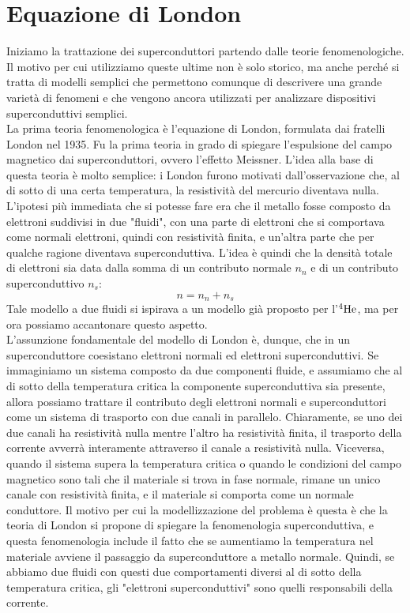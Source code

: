 \section{Equazione di London}
Iniziamo la trattazione dei superconduttori partendo dalle teorie fenomenologiche. Il motivo per cui utilizziamo queste ultime non è solo storico, ma anche perché si tratta di modelli semplici che permettono comunque di descrivere una grande varietà di fenomeni e che vengono ancora utilizzati per analizzare dispositivi superconduttivi semplici.\\
La prima teoria fenomenologica è l'equazione di London, formulata dai fratelli London nel 1935. Fu la prima teoria in grado di spiegare l'espulsione del campo magnetico dai superconduttori, ovvero l'effetto Meissner. L'idea alla base di questa teoria è molto semplice: i London furono motivati dall'osservazione che, al di sotto di una certa temperatura, la resistività del mercurio diventava nulla. L'ipotesi più immediata che si potesse fare era che il metallo fosse composto da elettroni suddivisi in due "fluidi", con una parte di elettroni che si comportava come normali elettroni, quindi con resistività finita, e un'altra parte che per qualche ragione diventava superconduttiva. L'idea è quindi che la densità totale di elettroni sia data dalla somma di un contributo normale $n_n$ e di un contributo superconduttivo $n_s$:
\begin{equation}
   n=n_n + n_s
   \label{eq:densita_elettroni}
\end{equation}
Tale modello a due fluidi si ispirava a un modello già proposto per l'$^4\rm He$, ma per ora possiamo accantonare questo aspetto.\\
L'assunzione fondamentale del modello di London è, dunque, che in un superconduttore coesistano elettroni normali ed elettroni superconduttivi. Se immaginiamo un sistema composto da due componenti fluide, e assumiamo che al di sotto della temperatura critica la componente superconduttiva sia presente, allora possiamo trattare il contributo degli elettroni normali e superconduttori come un sistema di trasporto con due canali in parallelo. Chiaramente, se uno dei due canali ha resistività nulla mentre l'altro ha resistività finita, il trasporto della corrente avverrà interamente attraverso il canale a resistività nulla. Viceversa, quando il sistema supera la temperatura critica o quando le condizioni del campo magnetico sono tali che il materiale si trova in fase normale, rimane un unico canale con resistività finita, e il materiale si comporta come un normale conduttore. Il motivo per cui la modellizzazione del problema è questa è che la teoria di London si propone di spiegare la fenomenologia superconduttiva, e questa fenomenologia include il fatto che se aumentiamo la temperatura nel materiale avviene il passaggio da superconduttore a metallo normale. Quindi, se abbiamo due fluidi con questi due comportamenti diversi al di sotto della temperatura critica, gli "elettroni superconduttivi" sono quelli responsabili della corrente.
